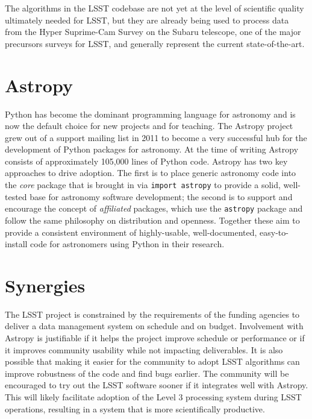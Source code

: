\documentclass[]{spie}  %
\begin{document}
The algorithms in the LSST codebase are not yet at the level of scientific quality ultimately needed for LSST, but they are already being used to process data from the Hyper Suprime-Cam Survey on the Subaru telescope\cite{2012SPIE.8446E..0ZM,2016arXiv160302281M}, one of the major precursors surveys for LSST, and generally represent the current state-of-the-art.


\section{Astropy}

Python has become the dominant programming language for astronomy\cite{2000ASPC..216...59G,2006ASPC..351..343H,2006ASPC..351..497K,2011ASPC..442..425G,2012SPIE.8451E..02J} and is now the default choice for new projects and for teaching.
The Astropy\cite{2013A&A...558A..33A} project grew out of a support mailing list in 2011 to become a very successful hub for the development of Python packages for astronomy.
At the time of writing Astropy consists of approximately 105,000 lines of Python code.
Astropy has two key approaches to drive adoption.
The first is to place generic astronomy code into the \emph{core} package that is brought in via \texttt{import astropy} to provide a solid, well-tested base for astronomy software development; the second is to support and encourage the concept of \emph{affiliated} packages, which use the \texttt{astropy} package and follow the same philosophy on distribution and openness.
Together these aim to provide a consistent environment of highly-usable, well-documented, easy-to-install code for astronomers using Python in their research.

\section{Synergies}

The LSST project is constrained by the requirements of the funding agencies to deliver a data management system on schedule and on budget.
Involvement with Astropy is justifiable if it helps the project improve schedule or performance or if it improves community usability while not impacting deliverables.
It is also possible that making it easier for the community to adopt LSST algorithms can improve robustness of the code and find bugs earlier.
The community will be encouraged to try out the LSST software sooner if it integrates well with Astropy.
This will likely facilitate adoption of the Level 3 processing system during LSST operations, resulting in a system that is more scientifically productive.
\end{document}
